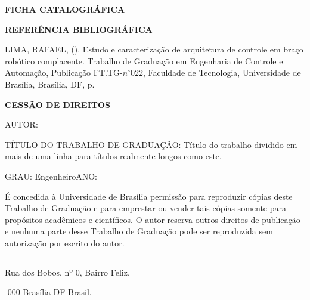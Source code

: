 \noindent \textbf{FICHA CATALOGRÁFICA}

\noindent %

\noindent \medskip{}


\noindent \textbf{REFERÊNCIA BIBLIOGRÁFICA}

LIMA, RAFAEL, (\the\year). Estudo e caracterização de arquitetura de controle em braço robótico complacente. Trabalho de Graduação
em Engenharia de Controle e Automação, Publicação FT.TG-$n^{\circ}022$,
Faculdade de Tecnologia, Universidade de Brasília, Brasília, DF, \pageref{LastPage}p.

\noindent \bigskip{}


\noindent \textbf{CESSÃO DE DIREITOS}

\noindent AUTOR: \autorinome

TÍTULO DO TRABALHO DE GRADUAÇÃO: Título do trabalho dividido em mais
de uma linha para títulos realmente longos como este.

\noindent \medskip{}


\noindent GRAU: Engenheiro\hfill{}ANO: \the\year\hfill{}

\noindent \medskip{}


É concedida à Universidade de Brasília permissão para reproduzir cópias
deste Trabalho de Graduação e para emprestar ou vender tais cópias
somente para propósitos acadêmicos e científicos. O autor reserva
outros direitos de publicação e nenhuma parte desse Trabalho de Graduação
pode ser reproduzida sem autorização por escrito do autor.

\noindent \bigskip{}


\noindent \rule[0.5ex]{1\columnwidth}{1pt}

\noindent \autorinome

\noindent Rua dos Bobos, nº 0, Bairro Feliz.

-000 Brasília \textendash{} DF \textendash{} Brasil.
